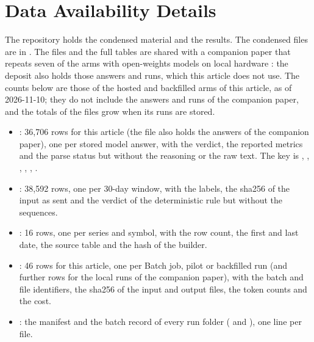 \section{Data Availability Details}
\label{app:data}

The repository holds the condensed material and the results. The condensed files are in . The files and the full tables are shared with a companion paper that repeats seven of the arms with open-weights models on local hardware \cite{regan2026openweights}: the deposit also holds those answers and runs, which this article does not use. The counts below are those of the hosted and backfilled arms of this article, as of 2026-11-10; they do not include the answers and runs of the companion paper, and the totals of the files grow when its runs are stored.
\begin{itemize}[leftmargin=*,labelsep=5.5mm]
\item {}: 36{,}706 rows for this article (the file also holds the answers of the companion paper), one per stored model answer, with the verdict, the reported metrics and the parse status but without the reasoning or the raw text. The key is , , , , , .
\item {}: 38{,}592 rows, one per 30-day window, with the labels, the sha256 of the input as sent and the verdict of the deterministic rule but without the sequences.
\item {}: 16 rows, one per series and symbol, with the row count, the first and last date, the source table and the hash of the builder.
\item {}: 46 rows for this article, one per Batch job, pilot or backfilled run (and further rows for the local runs of the companion paper), with the batch and file identifiers, the sha256 of the input and output files, the token counts and the cost.
\item {}: the manifest and the batch record of every run folder ( and ), one line per file.
\end{itemize}

